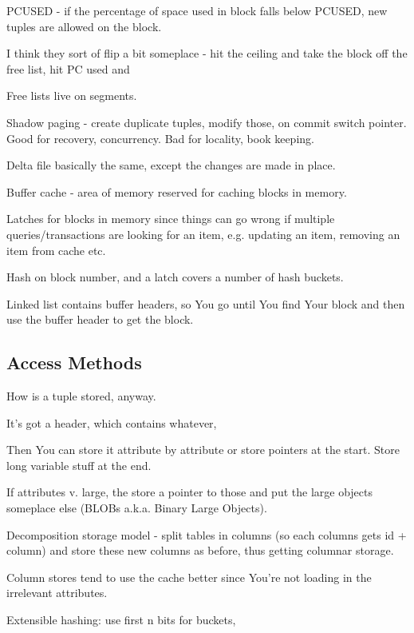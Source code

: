 \documentclass{article}
\begin{document}
		PCUSED - if the percentage of space used in block falls below PCUSED, new tuples are allowed on the block.
		
		I think they sort of flip a bit someplace - hit the ceiling and take the block off the free list, hit PC used and 
		
		Free lists live on segments.
		
		Shadow paging - create duplicate tuples, modify those, on commit switch pointer. Good for recovery, concurrency. Bad for locality, book keeping.
		
		Delta file basically the same, except the changes are made in place.
		
		Buffer cache - area of memory reserved for caching blocks in memory.
		
		Latches for blocks in memory since things can go wrong if multiple queries/transactions are looking for an item, e.g. updating an item, removing an item from cache etc.
		
		Hash on block number, and a latch covers a number of hash buckets.
		
		Linked list contains buffer headers, so You go until You find Your block and then use the buffer header to get the block.
		
	\subsection{Access Methods}
	
		How is a tuple stored, anyway.
		
		It's got a header, which contains whatever, 
		
		Then You can store it attribute by attribute or store pointers at the start. Store long variable stuff at the end.
		
		If attributes v. large, the store a pointer to those and put the large objects someplace else (BLOBs a.k.a. Binary Large Objects).
		
		Decomposition storage model - split tables in columns (so each columns gets id + column) and store these new columns as before, thus getting columnar storage.
		
		Column stores tend to use the cache better since You're not loading in the irrelevant attributes.
		
		Extensible hashing: use first n bits for buckets, 
				
		
			
	
		
	
	
		
		
		
		
		
		
\end{document}
